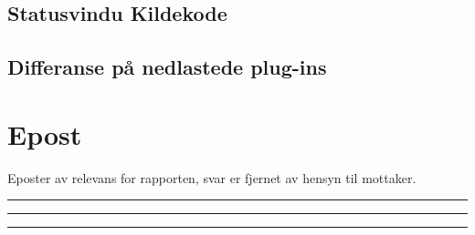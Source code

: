 \documentclass[a4paper,twoside,11pt,pdftex,norsk]{report}
\newenvironment{changemargin}[2]{%
\begin{list}{}{%
\linespread{0.9}%
\setlength{\topsep}{0pt}%
\setlength{\leftmargin}{#1}%
\setlength{\rightmargin}{#2}%
\setlength{\listparindent}{\parindent}%
\setlength{\itemindent}{\parindent}%
\setlength{\parsep}{\parskip}%
}%
\item[]}{\end{list}}
\begin{document}
\begin{appendices}
\begin{changemargin}{-1cm}{-1cm}
\section{Statusvindu Kildekode}







\clearpage
\section{Differanse på nedlastede plug-ins}

\end{changemargin}

\chapter{Epost}\label{epost}
Eposter av relevans for rapporten, svar er fjernet av hensyn til mottaker.
\clearpage

\noindent\rule{\textwidth}{0.4pt}

\noindent\rule{\textwidth}{0.4pt}

\clearpage

\noindent\rule{\textwidth}{0.4pt}

\clearpage

\clearpage
{}
\end{appendices}
\end{document}
